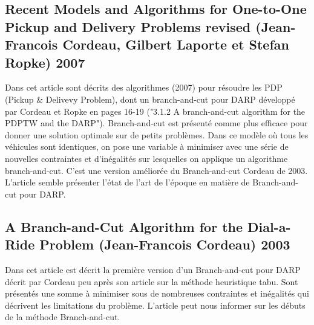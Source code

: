\documentclass[11pt,a4paper]{report}
\begin{document}
\subsection*{Recent Models and Algorithms for One-to-One
Pickup and Delivery Problems revised (Jean-Francois Cordeau, Gilbert Laporte et Stefan Ropke) 2007}
Dans cet article sont décrits des algorithmes (2007) pour résoudre les PDP (Pickup \& Delivevy Problem), dont un branch-and-cut pour DARP développé par Cordeau et Ropke en pages 16-19 ("3.1.2 A branch-and-cut algorithm for the PDPTW and the DARP").
Branch-and-cut est présenté comme plus efficace pour donner une solution optimale sur de petits problèmes.
Dans ce modèle où tous les véhicules sont identiques, on pose une variable à minimiser avec une série de nouvelles contraintes et d'inégalités sur lesquelles on applique un algorithme branch-and-cut. C'est une version améliorée du Branch-and-cut Cordeau de 2003.
L'article semble présenter l'état de l'art de l'époque en matière de Branch-and-cut pour DARP.
\subsection*{A Branch-and-Cut Algorithm for the Dial-a-Ride Problem (Jean-Francois Cordeau) 2003}
Dans cet article est décrit la première version d'un Branch-and-cut pour DARP décrit par Cordeau peu après son article sur la méthode heuristique tabu. Sont présentés une somme à minimiser sous de nombreuses contraintes et inégalités qui décrivent les limitations du problème.
L'article peut nous informer sur les débuts de la méthode Branch-and-cut.
\end{document}
